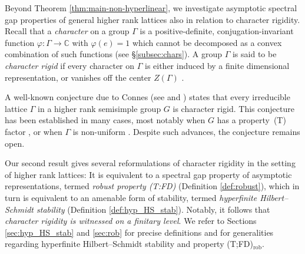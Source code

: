\documentclass[11pt]{amsart}
\newcommand{\C}{{\mathbb{C}}}
\theoremstyle{definition}
\theoremstyle{remark}
\theoremstyle{definition}
\begin{document}
Beyond Theorem \ref{thm:main-non-hyperlinear}, we investigate asymptotic spectral gap properties of general higher rank lattices also in relation to character rigidity.
 Recall that a \emph{character} on a group $\Gamma$ is a positive-definite, conjugation-invariant function $\varphi:\Gamma \to \C$ with $\varphi(e)=1$ which cannot be decomposed as a convex combination of such functions (see \S\ref{subsec:chars}). 
 A group $\Gamma$ is said to be \emph{character rigid} if every character on $\Gamma$ is either induced by a finite dimensional representation, or vanishes off the center  $Z(\Gamma)$ \cite[Definition 1.1]{char-rig-nonuniform}.
 
 A well-known conjecture due to Connes (see  \cite{Jo00} and \cite{houdayer2021noncommutative}) states that every irreducible lattice $\Gamma$ in a higher rank semisimple group $G$ is character rigid.
This conjecture has been established in many cases, most notably when $G$  has a property~(T) factor \cite{bekka2006operator,peterson2015character, boutonnet2021stationary,BBHP,BBH,creutz2024character},
or when $\Gamma$ is non-uniform \cite{char-rig-nonuniform, PT}. 
Despite such advances, the conjecture remains open.



Our second result gives several reformulations of character rigidity in the setting of higher rank lattices:
It is equivalent to a spectral gap property of asymptotic representations, termed \emph{robust property (T:FD)} (Definition \ref{def:robust}), which in turn is equivalent to an amenable  form of stability, termed \emph{hyperfinite Hilbert--Schmidt stability} (Definition \ref{def:hyp_HS_stab}).
Notably, it  follows that \emph{character rigidity is witnessed on a finitary level}.
We refer to Sections \ref{sec:hyp_HS_stab} and \ref{sec:rob} for precise definitions and for generalities regarding hyperfinite Hilbert--Schmidt stability and property \textnormal{(T;FD)}$_{\mathrm{rob}}$.
\end{document}
